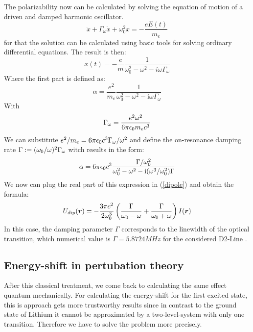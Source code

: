 The polarizability now can be calculated by solving the equation of motion of a driven and damped harmonic oscillator.
\begin{equation}
\ddot x+\Gamma_\omega\dot x+\omega^2_0x=-\frac{eE(t)}{m_e}
\end{equation} 
for that the solution can be calculated using basic tools for solving ordinary differential equations. The result is then:
\begin{equation}
x(t)=-\frac{e}{m}\frac{1}{\omega^2_0-\omega^2-i\omega\Gamma_\omega}
\end{equation}
Where the first part is defined as:
\begin{equation}
\alpha=\frac{e^2}{m_e}\frac{1}{\omega^2_0-\omega^2-\mathrm{i}\omega\Gamma_\omega}
\end{equation} 
With
\begin{equation}
\Gamma_\omega=\frac{e^2\omega^2}{6\pi\epsilon_0m_ec^3}
\end{equation}
We can substitute $e^2/m_e=6\pi\epsilon_0c^3\Gamma_\omega/\omega^2$ and define the on-resonance damping rate $\Gamma:=(\omega_0/\omega)^2\Gamma_\omega$ witch results in the form:
\begin{equation}
\alpha=6\pi\epsilon_0c^3\frac{\Gamma/\omega^2_0}{\omega^2_0-\omega^2-\mathrm{i}(\omega^3/\omega^2_0)\Gamma}
\end{equation} 
We now can plug the real part of this expression in (\ref{dipole}) and obtain the formula:
\begin{equation}
U_{dip}(\boldsymbol{r})=-\frac{3\pi c^2}{2\omega^3_0}\left(\frac{\Gamma}{\omega_0-\omega}+\frac{\Gamma}{\omega_0+\omega}\right	)I(\boldsymbol{r})
\label{classic}\end{equation}
In this case, the damping parameter $\Gamma$ corresponds to the linewidth of the optical transition, which numerical value is $\Gamma=5.8724 \unit{MHz}$ for the considered D2-Line \cite{gehm}.

\subsection{Energy-shift in pertubation theory}

After this classical treatment, we come back to calculating the same effect quantum mechanically. For calculating the energy-shift for the first excited state, this is approach gets more trustworthy results since in contrast to the ground state of Lithium it cannot be approximated by a two-level-system with only one transition. Therefore we have to solve the problem more precisely. 

